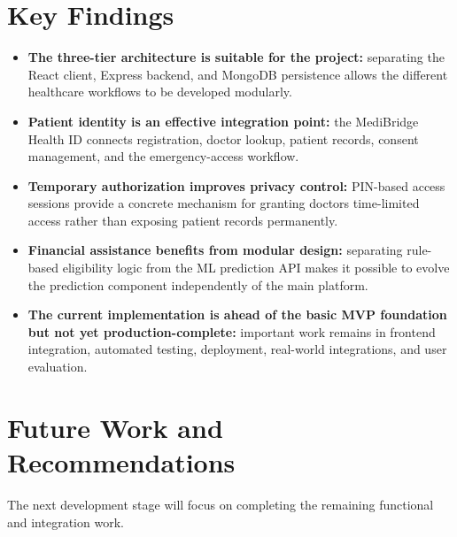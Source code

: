 \documentclass{tietreport}
\begin{document}
\section{Key Findings}

\begin{itemize}
  \item \textbf{The three-tier architecture is suitable for the project:}
    separating the React client, Express backend, and MongoDB persistence
    allows the different healthcare workflows to be developed
    modularly.

  \item \textbf{Patient identity is an effective integration point:}
    the MediBridge Health ID connects registration, doctor lookup,
    patient records, consent management, and the emergency-access
    workflow.

  \item \textbf{Temporary authorization improves privacy control:}
    PIN-based access sessions provide a concrete mechanism for granting
    doctors time-limited access rather than exposing patient records
    permanently.

  \item \textbf{Financial assistance benefits from modular design:}
    separating rule-based eligibility logic from the ML prediction API
    makes it possible to evolve the prediction component independently
    of the main platform.

  \item \textbf{The current implementation is ahead of the basic MVP
    foundation but not yet production-complete:} important work remains
    in frontend integration, automated testing, deployment, real-world
    integrations, and user evaluation.
\end{itemize}

\section{Future Work and Recommendations}

The next development stage will focus on completing the remaining
functional and integration work.
\end{document}
